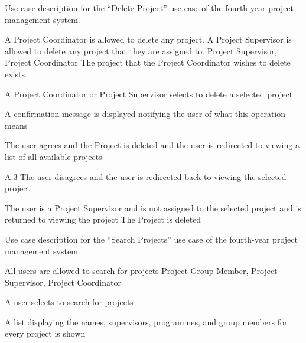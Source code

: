 \documentclass[document.tex]{subfiles}
\begin{document}
\begin{table}
  \centering
  \caption{Use case description for the ``Delete Project'' use case of the fourth-year project management system.}
  \label{tbl:use-case-delete-project}

  \begin{usecase}
    A Project Coordinator is allowed to delete any project. A Project Supervisor is allowed to delete any project that they are assigned to.
    Project Supervisor, Project Coordinator
    The project that the Project Coordinator wishes to delete exists
    \ucnormal
    \begin{ucenum}
      \item A Project Coordinator or Project Supervisor selects to delete a selected project
      \item A confirmation message is displayed notifying the user of what this operation means
      \item The user agrees and the Project is deleted and the user is redirected to viewing a list of all available projects
    \end{ucenum}
    \begin{ucenum}
      \item [A.3] The user disagrees and the user is redirected back to viewing the selected project
    \end{ucenum}
    The user is a Project Supervisor and is not assigned to the selected project and is returned to viewing the project
    The Project is deleted
  \end{usecase}
\end{table}


\begin{table}
  \centering
  \caption{Use case description for the ``Search Projects'' use case of the fourth-year project management system.}
  \label{tbl:use-case-search-project}

  \begin{usecase}
    All users are allowed to search for projects
    Project Group Member, Project Supervisor, Project Coordinator
    \ucnormal
    \begin{ucenum}
      \item A user selects to search for projects
      \item A list displaying the names, supervisors, programmes, and group members for every project is shown
    \end{ucenum}
  \end{usecase}
\end{table}
\end{document}
